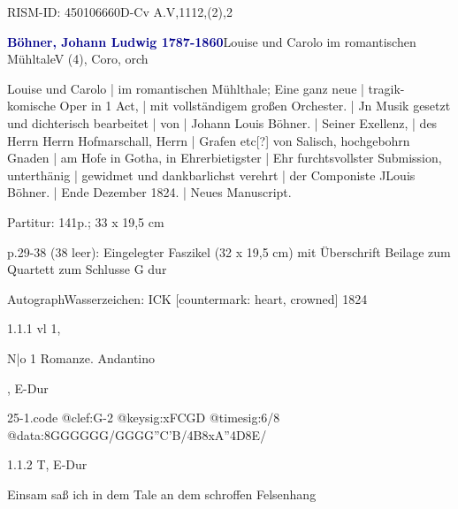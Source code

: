 \documentclass[a4paper, twocolumn, 11pt]{book}
\begin{document}
\par RISM-ID: 450106660\newline D-Cv  A.V,1112,(2),2
\par \vspace{16pt} \textcolor{darkblue}{\textbf{Böhner, Johann Ludwig  1787-1860}}\hfillplus{[25]}\newline Louise und Carolo im romantischen Mühltale\newline V (4), Coro, orch
\par \begin{itshape} Louise und Carolo | im romantischen Mühlthale; Eine ganz neue | tragik-komische Oper in 1 Act, | mit vollständigem großen Orchester. | Jn Musik gesetzt und dichterisch bearbeitet | von | Johann Louis Böhner. | Seiner Exellenz, | des Herrn Herrn Hofmarschall, Herrn | Grafen etc[?] von Salisch, hochgebohrn Gnaden | am Hofe in Gotha, in Ehrerbietigster | Ehr furchtsvollster Submission, unterthänig | gewidmet und dankbarlichst verehrt | der Componiste JLouis Böhner. | Ende Dezember 1824. | Neues Manuscript.\end{itshape} 
\par \textcolor{darkblue}{}  Partitur: 141p.; 33 x 19,5 cm\newline \begin{small} p.29-38 (38 leer): Eingelegter Faszikel (32 x 19,5 cm) mit Überschrift {\textquotedbl}Beilage zum Quartett zum Schlusse G dur{\textquotedbl}\end{small} \newline Autograph\newline Wasserzeichen: ICK [countermark: heart, crowned]  1824
\par 1.1.1  vl 1, \begin{itshape}N|o 1 Romanze. Andantino\end{itshape}, E-Dur  
\begin{filecontents*}{25-1.code}
@clef:G-2
@keysig:xFCGD
@timesig:6/8
@data:{8GGG}{GGG}/{GGG}{G''C'B}/4B8xA''4D8E/
\end{filecontents*}
\newline %
\par 1.1.2  T, E-Dur\newline \begin{footnotesize} Einsam saß ich in dem Tale an dem schroffen Felsenhang \end{footnotesize}  
\end{document}
